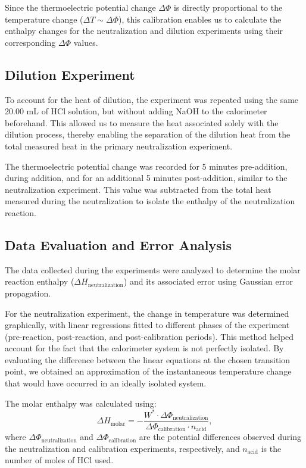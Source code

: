 \documentclass[a4paper,12pt]{article}
\begin{document}
Since the thermoelectric potential change \(\Delta \Phi\) is directly proportional to the temperature change (\(\Delta T \sim \Delta \Phi\)), this calibration enables us to calculate the enthalpy changes for the neutralization and dilution experiments using their corresponding \(\Delta \Phi\) values.

\subsection{Dilution Experiment}
To account for the heat of dilution, the experiment was repeated using the same 20.00 mL of HCl solution, but without adding NaOH to the calorimeter beforehand. This allowed us to measure the heat associated solely with the dilution process, thereby enabling the separation of the dilution heat from the total measured heat in the primary neutralization experiment.

The thermoelectric potential change was recorded for 5 minutes pre-addition, during addition, and for an additional 5 minutes post-addition, similar to the neutralization experiment. This value was subtracted from the total heat measured during the neutralization to isolate the enthalpy of the neutralization reaction.

\subsection{Data Evaluation and Error Analysis}
The data collected during the experiments were analyzed to determine the molar reaction enthalpy (\(\Delta H_{\text{neutralization}}\)) and its associated error using Gaussian error propagation.

For the neutralization experiment, the change in temperature was determined graphically, with linear regressions fitted to different phases of the experiment (pre-reaction, post-reaction, and post-calibration periods). This method helped account for the fact that the calorimeter system is not perfectly isolated. By evaluating the difference between the linear equations at the chosen transition point, we obtained an approximation of the instantaneous temperature change that would have occurred in an ideally isolated system.

The molar enthalpy was calculated using:
\begin{equation}
\Delta H_{\text{molar}} = -\frac{W^* \cdot \Delta \Phi_{\text{neutralization}}}{\Delta \Phi_{\text{calibration}} \cdot n_{\text{acid}}},
\end{equation}
where \(\Delta \Phi_{\text{neutralization}}\) and \(\Delta \Phi_{\text{calibration}}\) are the potential differences observed during the neutralization and calibration experiments, respectively, and \(n_{\text{acid}}\) is the number of moles of HCl used.
\end{document}
